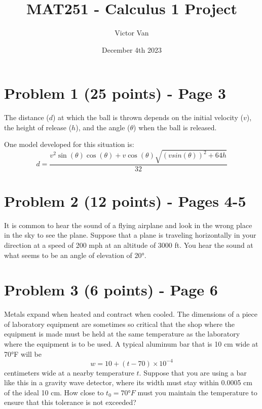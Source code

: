 \documentclass{article}
\title{MAT251 - Calculus 1 Project}
\author{Victor Van}
\date{December 4th 2023}
\begin{document}
\maketitle

\newpage

\setcounter{tocdepth}{1} %

\tableofcontents

\section*{Problem 1 (25 points) - Page 3}
The distance ($d$) at which the ball is thrown depends on the initial velocity ($v$), the height of release ($h$), and the angle ($\theta$) when the ball is released.

One model developed for this situation is:
\begin{equation}
    d = \frac{v^2 \sin(\theta) \cos(\theta) + v\cos(\theta) \sqrt{(vsin(\theta))^2 + 64h}}{32}
\end{equation}

\section*{Problem 2 (12 points) - Pages 4-5}
It is common to hear the sound of a flying airplane and look in the wrong place in the sky to see the plane. Suppose that a plane is traveling horizontally in your direction at a speed of 200 mph at an altitude of 3000 ft. You hear the sound at what seems to be an angle of elevation of 20°.

\section*{Problem 3 (6 points) - Page 6}
Metals expand when heated and contract when cooled. The dimensions of a piece of laboratory equipment are sometimes so critical that the shop where the equipment is made must be held at the same temperature as the laboratory where the equipment is to be used. A typical aluminum bar that is 10 cm wide at 70°F will be 
\begin{equation}
    w = 10 + (t-70) \times 10^{-4}
\end{equation}
centimeters wide at a nearby temperature \(t\). Suppose that you are using a bar like this in a gravity wave detector, where its width must stay within 0.0005 cm of the ideal 10 cm. How close to \(t_0 = 70°F\) must you maintain the temperature to ensure that this tolerance is not exceeded?
\end{document}
